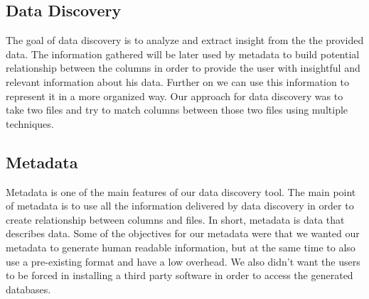 \subsection{Data Discovery}
The goal of data discovery is to analyze and extract insight from the the provided data. The information gathered will be later used by metadata to build potential relationship between the columns in order to provide the user with insightful and relevant information about his data. Further on we can use this information to represent it in a more organized way. Our approach for data discovery was to take two files and try to match columns between those two files using multiple techniques.

\vspace{5mm} %
\subsection{Metadata}
Metadata is one of the main features of our data discovery tool. The main point of metadata is to use all the information delivered by data discovery in order to create relationship between columns and files. In short, metadata is data that describes data.
\newline
Some of the objectives for our metadata were that we wanted our metadata to generate human readable information, but at the same time to also use a pre-existing format and have a low overhead. We also didn't want the users to be forced in installing a third party software in order to access the generated databases.
\newline

\clearpage

